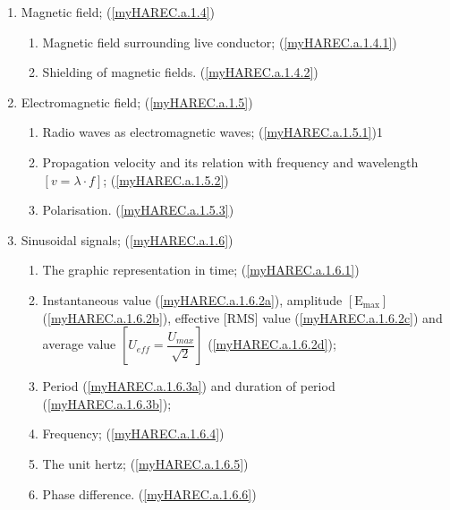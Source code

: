 \begin{enumerate}
\begin{enumerate}
\item Magnetic field; (\ref{myHAREC.a.1.4})\label{HAREC.a.1.4}
\begin{enumerate}
\item Magnetic field surrounding live conductor; (\ref{myHAREC.a.1.4.1})\label{HAREC.a.1.4.1}
\item Shielding of magnetic fields. (\ref{myHAREC.a.1.4.2})\label{HAREC.a.1.4.2}
\end{enumerate}

\item Electromagnetic field; (\ref{myHAREC.a.1.5})\label{HAREC.a.1.5}
\begin{enumerate}
\item Radio waves as electromagnetic waves; (\ref{myHAREC.a.1.5.1})\label{HAREC.a.1.5.1}1
\item Propagation velocity and its relation with frequency and wavelength
  \(\left[v = \lambda \cdot f\right]\);
  (\ref{myHAREC.a.1.5.2})\label{HAREC.a.1.5.2}
\item Polarisation. (\ref{myHAREC.a.1.5.3})\label{HAREC.a.1.5.3}
\end{enumerate}

\item Sinusoidal signals; (\ref{myHAREC.a.1.6})\label{HAREC.a.1.6}
\begin{enumerate}
\item The graphic representation in time;
  (\ref{myHAREC.a.1.6.1})\label{HAREC.a.1.6.1}
\item Instantaneous value (\ref{myHAREC.a.1.6.2a})\label{HAREC.a.1.6.2a},
  amplitude \(\mathrm{[E_{max}]}\)
  (\ref{myHAREC.a.1.6.2b})\label{HAREC.a.1.6.2b},
  effective [RMS] value (\ref{myHAREC.a.1.6.2c})\label{HAREC.a.1.6.2c}
  and average value \(\left[U_{eff} = \dfrac{U_{max}}{\sqrt{2}}\right]\)
  (\ref{myHAREC.a.1.6.2d})\label{HAREC.a.1.6.2d};
\item Period (\ref{myHAREC.a.1.6.3a})\label{HAREC.a.1.6.3a}
  and duration of period (\ref{myHAREC.a.1.6.3b})\label{HAREC.a.1.6.3b};
\item Frequency; (\ref{myHAREC.a.1.6.4})\label{HAREC.a.1.6.4}
\item The unit hertz; (\ref{myHAREC.a.1.6.5})\label{HAREC.a.1.6.5}
\item Phase difference. (\ref{myHAREC.a.1.6.6})\label{HAREC.a.1.6.6}
\end{enumerate}


\end{enumerate}
\end{enumerate}
